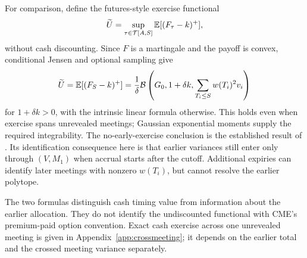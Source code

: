 For comparison, define the futures-style exercise functional
\[
\widetilde U=\sup_{\tau\in\mathcal T[A,S]}\mathbb E[(F_\tau-k)^+],
\]
without cash discounting. Since $F$ is a martingale and the payoff is convex, conditional Jensen and optional sampling give
\begin{equation}\label{eq:futuresstyle}
\widetilde U=\mathbb E[(F_S-k)^+]
 =\frac1\delta\mathcal B\left(G_0,1+\delta k,
                         \sum_{T_i\leq S}w(T_i)^2v_i\right)
\end{equation}
for $1+\delta k>0$, with the intrinsic linear formula otherwise. This holds even when exercise spans unrevealed meetings; Gaussian exponential moments supply the required integrability. The no-early-exercise conclusion is the established result of \citet{lieu1990option,chen1993pricing}. Its identification consequence here is that earlier variances still enter only through $(V,M_1)$ when accrual starts after the cutoff. Additional expiries can identify later meetings with nonzero $w(T_i)$, but cannot resolve the earlier polytope.

The two formulas distinguish cash timing value from information about the earlier allocation. They do not identify the undiscounted functional with CME's premium-paid option convention. Exact cash exercise across one unrevealed meeting is given in Appendix~\ref{app:crossmeeting}; it depends on the earlier total and the crossed meeting variance separately.
